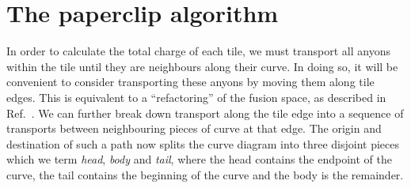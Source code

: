 \documentclass[aps, letterpaper, onecolumn, superscriptaddress, notitlepage, 10pt]{revtex4-1}
\begin{document}
%



%
%

\section{The paperclip algorithm}

In order to calculate the total charge of each tile, we must transport all anyons within the tile until they are neighbours along their curve. In doing so, it will be convenient to consider transporting these anyons by moving them along tile edges. This is equivalent to a ``refactoring'' of the fusion space, as described in Ref.~\cite{Burton2016}. We can further break down transport along the tile edge into a sequence of transports between neighbouring pieces of curve at that edge.
The origin and destination of such a path
now splits the curve diagram
into three disjoint pieces which we term
\emph{head}, \emph{body} and \emph{tail}, where
the head contains the endpoint of the curve, the tail
contains the beginning of the curve and the body is the remainder.
\end{document}
